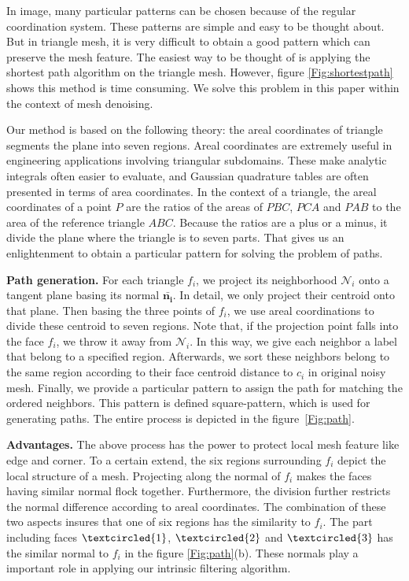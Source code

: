  In image, many particular patterns can be chosen because of the regular coordination system.
 These patterns are simple and easy to be thought about.
 But in triangle mesh, it is very difficult to obtain a good pattern which can preserve the mesh feature.
 The easiest way to be thought of is applying the shortest path algorithm on the triangle mesh.
 However, figure \ref{Fig:shortestpath} shows this method is time consuming.
 We solve this problem in this paper within the context of mesh denoising.

 Our method is based on the following theory: the areal coordinates of triangle segments the plane into seven regions.
 Areal coordinates are extremely useful in engineering applications involving triangular subdomains.
 These make analytic integrals often easier to evaluate, and Gaussian quadrature tables are often presented in terms of area coordinates.
 In the context of a triangle, the areal coordinates of a point $P$ are the ratios of the areas of $PBC$, $PCA$ and $PAB$ to the area of the reference triangle $ABC$.
 Because the ratios are a plus or a minus, it divide the plane where the triangle is to seven parts.
 That gives us an enlightenment to obtain a particular pattern for solving the problem of paths.

{\bfseries Path generation.}
For each triangle $f_i$, we project its neighborhood $\mathcal{N}_i$ onto a tangent plane basing its normal $\mathbf{\bar{n_i}}$.
In detail, we only project their centroid onto that plane.
Then basing the three points of $f_i$, we use areal coordinations to divide these centroid to seven regions.
Note that, if the projection point falls into the face $f_i$, we throw it away from $\mathcal{N}_i$.
In this way, we give each neighbor a label that belong to a specified region.
Afterwards, we sort these neighbors belong to the same region according to their face centroid distance to $c_i$ in original noisy mesh.
Finally, we provide a particular pattern to assign the path for matching the ordered neighbors.
This pattern is defined square-pattern, which is used for generating paths.
The entire process is depicted in the figure~\ref{Fig:path}.

{\bfseries Advantages.} 
 The above process has the power to protect local mesh feature like edge and corner.
 To a certain extend, the six regions surrounding $f_i$ depict the local structure of a mesh.
 Projecting along the normal of $f_i$ makes the faces having similar normal flock together.
 Furthermore, the division further restricts the normal difference according to areal coordinates.
 The combination of these two aspects insures that one of six regions has the similarity to $f_i$.
 The part including faces $\textcircled{1}$, $\textcircled{2}$ and $\textcircled{3}$ has the similar normal to $f_i$ in the figure \ref{Fig:path}(b).
 These normals play a important role in applying our intrinsic filtering algorithm.

